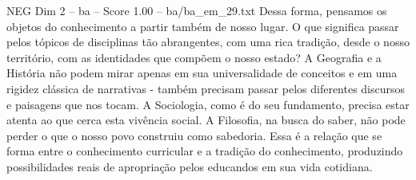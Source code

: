 \begin{textsample}{NEG Dim 2 – ba – Score 1.00 – ba/ba\_em\_29.txt}
Dessa forma, pensamos os objetos do conhecimento a partir também de nosso lugar.
O que significa passar pelos tópicos de disciplinas tão abrangentes, com uma rica tradição, desde o nosso território, com as identidades que compõem o nosso estado?
A Geografia e a História não podem mirar apenas em sua universalidade de conceitos e em uma rigidez clássica de narrativas - também precisam passar pelos diferentes discursos e paisagens que nos tocam.
A Sociologia, como é do seu fundamento, precisa estar atenta ao que cerca esta vivência social.
A Filosofia, na busca do saber, não pode perder o que o nosso povo construiu como sabedoria.
Essa é a relação que se forma entre o conhecimento curricular e a tradição do conhecimento, produzindo possibilidades reais de apropriação pelos educandos em sua vida cotidiana.

\end{textsample}
